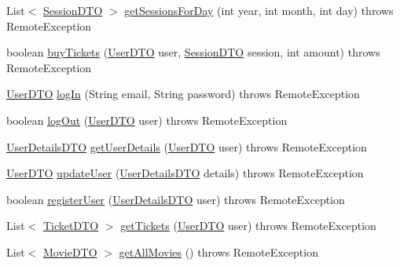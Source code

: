 \begin{DoxyCompactItemize}
\item 
List$<$ \mbox{\hyperlink{classes_1_1deusto_1_1server_1_1data_1_1_session_d_t_o}{Session\+D\+TO}} $>$ \mbox{\hyperlink{interfacees_1_1deusto_1_1server_1_1_i_server_aac50d6a77e30df4d4c15fcaf4ba979f5}{get\+Sessions\+For\+Day}} (int year, int month, int day)  throws Remote\+Exception
\item 
boolean \mbox{\hyperlink{interfacees_1_1deusto_1_1server_1_1_i_server_ac3302c01fefc37a32c0bcbf79fcce44b}{buy\+Tickets}} (\mbox{\hyperlink{classes_1_1deusto_1_1server_1_1data_1_1_user_d_t_o}{User\+D\+TO}} user, \mbox{\hyperlink{classes_1_1deusto_1_1server_1_1data_1_1_session_d_t_o}{Session\+D\+TO}} session, int amount)  throws Remote\+Exception
\item 
\mbox{\hyperlink{classes_1_1deusto_1_1server_1_1data_1_1_user_d_t_o}{User\+D\+TO}} \mbox{\hyperlink{interfacees_1_1deusto_1_1server_1_1_i_server_a62db155ac744b9712e303ceea76a3560}{log\+In}} (String email, String password)  throws Remote\+Exception
\item 
boolean \mbox{\hyperlink{interfacees_1_1deusto_1_1server_1_1_i_server_a479231082cae13f9c651c0ec2cb2cece}{log\+Out}} (\mbox{\hyperlink{classes_1_1deusto_1_1server_1_1data_1_1_user_d_t_o}{User\+D\+TO}} user)  throws Remote\+Exception
\item 
\mbox{\hyperlink{classes_1_1deusto_1_1server_1_1data_1_1_user_details_d_t_o}{User\+Details\+D\+TO}} \mbox{\hyperlink{interfacees_1_1deusto_1_1server_1_1_i_server_a2dcd7f0b0e157eb797e20432c0b0e971}{get\+User\+Details}} (\mbox{\hyperlink{classes_1_1deusto_1_1server_1_1data_1_1_user_d_t_o}{User\+D\+TO}} user)  throws Remote\+Exception
\item 
\mbox{\hyperlink{classes_1_1deusto_1_1server_1_1data_1_1_user_d_t_o}{User\+D\+TO}} \mbox{\hyperlink{interfacees_1_1deusto_1_1server_1_1_i_server_aff376200af975b145ac85ccfdf48a229}{update\+User}} (\mbox{\hyperlink{classes_1_1deusto_1_1server_1_1data_1_1_user_details_d_t_o}{User\+Details\+D\+TO}} details)  throws Remote\+Exception
\item 
boolean \mbox{\hyperlink{interfacees_1_1deusto_1_1server_1_1_i_server_a998e20655e760b135fab601a417aa5ae}{register\+User}} (\mbox{\hyperlink{classes_1_1deusto_1_1server_1_1data_1_1_user_details_d_t_o}{User\+Details\+D\+TO}} user)  throws Remote\+Exception
\item 
List$<$ \mbox{\hyperlink{classes_1_1deusto_1_1server_1_1data_1_1_ticket_d_t_o}{Ticket\+D\+TO}} $>$ \mbox{\hyperlink{interfacees_1_1deusto_1_1server_1_1_i_server_ab782fc42997e35e5288e2b38a718b5c7}{get\+Tickets}} (\mbox{\hyperlink{classes_1_1deusto_1_1server_1_1data_1_1_user_d_t_o}{User\+D\+TO}} user)  throws Remote\+Exception
\item 
List$<$ \mbox{\hyperlink{classes_1_1deusto_1_1server_1_1data_1_1_movie_d_t_o}{Movie\+D\+TO}} $>$ \mbox{\hyperlink{interfacees_1_1deusto_1_1server_1_1_i_server_adf8c1aa53cf63eafa97299c898539938}{get\+All\+Movies}} ()  throws Remote\+Exception
\end{DoxyCompactItemize}


